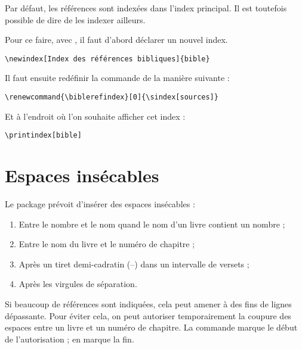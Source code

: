 Par défaut, les références sont indexées dans l'index principal. Il est toutefois possible de dire de les indexer ailleurs.

Pour ce faire, avec , il faut d'abord déclarer un nouvel index.

\begin{verbatim}
\newindex[Index des références bibliques]{bible}
\end{verbatim}

Il faut ensuite redéfinir la commande  de la manière suivante :
\begin{verbatim}
\renewcommand{\biblerefindex}[0]{\sindex[sources]}
\end{verbatim}

Et à l'endroit où l'on souhaite afficher cet index :
\begin{verbatim}
\printindex[bible]
\end{verbatim}

\section{Espaces insécables}

Le package  prévoit d'insérer des espaces insécables :
\begin{enumerate}
\item Entre le nombre et le nom quand le nom d’un livre contient un nombre ;
\item Entre le nom du livre et le numéro de chapitre ;
\item Après un tiret demi-cadratin (–) dans un intervalle de versets ; 
\item Après les virgules de séparation.
\end{enumerate}

Si beaucoup de références sont indiquées, cela peut amener à des fins de lignes dépassante.
Pour éviter cela, on peut autoriser temporairement la coupure des espaces entre un livre et un numéro de chapitre. La commande  marque le début de l'autorisation ;  en marque la fin.


